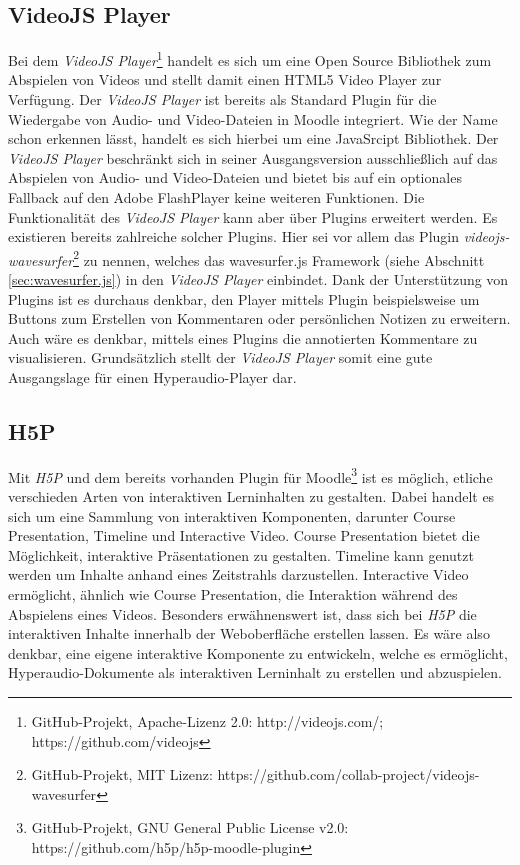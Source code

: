 \subsection{VideoJS Player}
Bei dem \textit{VideoJS Player}\footnote{GitHub-Projekt, Apache-Lizenz 2.0: http://videojs.com/; https://github.com/videojs} handelt es sich um eine Open Source Bibliothek zum Abspielen von Videos und stellt damit einen HTML5 Video Player zur Verfügung. Der \textit{VideoJS Player} ist bereits als Standard Plugin für die Wiedergabe von Audio- und Video-Dateien in Moodle integriert. Wie der Name schon erkennen lässt, handelt es sich hierbei um eine JavaSrcipt Bibliothek. Der \textit{VideoJS Player} beschränkt sich in seiner Ausgangsversion ausschließlich auf das Abspielen von Audio- und Video-Dateien und bietet bis auf ein optionales Fallback auf den Adobe FlashPlayer keine weiteren Funktionen. Die Funktionalität des \textit{VideoJS Player} kann aber über Plugins erweitert werden. Es existieren bereits zahlreiche solcher Plugins. Hier sei vor allem das Plugin \textit{videojs-wavesurfer}\footnote{GitHub-Projekt, MIT Lizenz: https://github.com/collab-project/videojs-wavesurfer} zu nennen, welches das wavesurfer.js Framework (siehe Abschnitt \ref{sec:wavesurfer.js}) in den \textit{VideoJS Player} einbindet. Dank der Unterstützung von Plugins ist es durchaus denkbar, den Player mittels Plugin beispielsweise um Buttons zum Erstellen von Kommentaren oder persönlichen Notizen zu erweitern. Auch wäre es denkbar, mittels eines Plugins die annotierten Kommentare zu visualisieren. Grundsätzlich stellt der \textit{VideoJS Player} somit eine gute Ausgangslage für einen Hyperaudio-Player dar.

\subsection{H5P}
Mit \textit{H5P} und dem bereits vorhanden Plugin für Moodle\footnote{GitHub-Projekt, GNU General Public License v2.0: https://github.com/h5p/h5p-moodle-plugin} ist es möglich, etliche verschieden Arten von interaktiven Lerninhalten zu gestalten. Dabei handelt es sich um eine Sammlung von interaktiven Komponenten, darunter Course Presentation, Timeline und Interactive Video. Course Presentation bietet die Möglichkeit, interaktive Präsentationen zu gestalten. Timeline kann genutzt werden um Inhalte anhand eines Zeitstrahls darzustellen. Interactive Video ermöglicht, ähnlich wie Course Presentation, die Interaktion während des Abspielens eines Videos. Besonders erwähnenswert ist, dass sich bei \textit{H5P} die interaktiven Inhalte innerhalb der Weboberfläche erstellen lassen. Es wäre also denkbar, eine eigene interaktive Komponente zu entwickeln, welche es ermöglicht, Hyperaudio-Dokumente als interaktiven Lerninhalt zu erstellen und abzuspielen.


